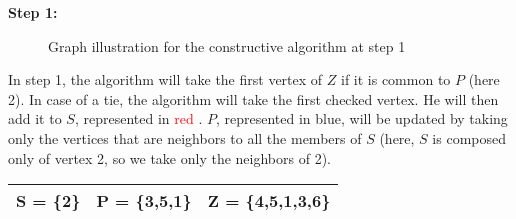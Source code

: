     \begin{minipage}{\linewidth}
        \textbf{Step 1:} \newline
        \begin{minipage}{0.4\textwidth}
            \begin{figure}[H]
                \centering
                \caption{Graph illustration for the constructive algorithm at step 1}
                \label{fig:constructive-mewc-maxedge-step1}
            \end{figure}
        \end{minipage}
        \begin{minipage}{0.6\textwidth}
            In step 1, the algorithm will take the first vertex of $Z$ if it is common to $P$ (here 2). In case of a tie, the algorithm will take the first checked vertex. He will then add it to $S$, represented in \textcolor{red}{red} . $P$, represented in \textcolor{Cerulean}{blue}, will be updated by taking only the vertices that are neighbors to all the members of $S$ (here, $S$ is composed only of vertex 2, so we take only the neighbors of 2).
    
            \begin{center}
                \begin{tabular}{|lll|}
                    \hline
                    S = \{2\} & P = \{3,5,1\} & Z = \{4,5,1,3,6\} \\
                    \hline
                \end{tabular}
            \end{center}
        \end{minipage}
    \end{minipage} 

